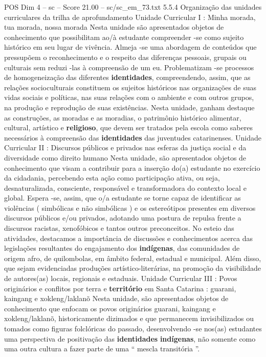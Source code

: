 \begin{textsample}{POS Dim 4 – sc – Score 21.00 – sc/sc\_em\_73.txt}  \label{ex:f4_pos_031}
5.5.4 Organização das unidades curriculares da trilha de aprofundamento Unidade Curricular I : Minha morada, tua morada, nossa morada Nesta unidade são apresentados objetos de conhecimento que possibilitam ao/à estudante compreender -se como sujeito histórico em seu lugar de vivência.
Almeja -se uma abordagem de conteúdos que pressupõem o reconhecimento e o respeito das diferenças pessoais, grupais ou culturais sem reduzi -las à compreensão de um eu.
Problematizam -se processos de homogeneização das diferentes \textbf{identidades}, compreendendo, assim, que as relações socioculturais constituem os sujeitos históricos nas organizações de suas vidas sociais e políticas, nas suas relações com o ambiente e com outros grupos, na produção e reprodução de suas existências.
Nesta unidade, ganham destaque as construções, as moradas e as moradias, o patrimônio histórico alimentar, cultural, artístico e \textbf{religioso}, que devem ser tratados pela escola como saberes necessários à compreensão das \textbf{identidades} das juventudes catarinenses.
Unidade Curricular II : Discursos públicos e privados nas esferas da justiça social e da diversidade como direito humano Nesta unidade, são apresentados objetos de conhecimento que visam a contribuir para a inserção do(a) estudante no exercício da cidadania, percebendo esta ação como participação ativa, ou seja, desnaturalizada, consciente, responsável e transformadora do contexto local e global.
Espera -se, assim, que o/a estudante se torne capaz de identificar as violências ( simbólicas e não simbólicas ) e os estereótipos presentes em diversos discursos públicos e/ou privados, adotando uma postura de repulsa frente a discursos racistas, xenofóbicos e tantos outros preconceitos.
No esteio das atividades, destacamos a importância de discussões e conhecimentos acerca das legislações resultantes do engajamento dos \textbf{indígenas}, das comunidades de origem afro, de quilombolas, em âmbito federal, estadual e municipal.
Além disso, que sejam evidenciadas produções artístico-literárias, na promoção da visibilidade de autores(as) locais, regionais e estaduais.
Unidade Curricular III : Povos originários e conflitos por terra e \textbf{território} em Santa Catarina : guarani, kaingang e xokleng/laklanõ Nesta unidade, são apresentados objetos de conhecimento que enfocam os povos originários guarani, kaingang e xokleng/laklanõ, historicamente dizimados e que permanecem invisibilizados ou tomados como figuras folclóricas do passado, desenvolvendo -se nos(as) estudantes uma perspectiva de positivação das \textbf{identidades} \textbf{indígenas}, não somente como uma outra cultura a fazer parte de uma “ mescla transitória ”.

\end{textsample}
